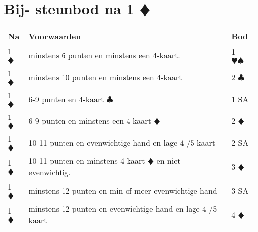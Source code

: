\documentclass[12pt,a4paper]{report}
\begin{document}
\section{Bij- steunbod na 1 $\vardiamondsuit$}
\begin{tabular}{|l|p{5cm}|l|}
	\hline 
	\textbf{Na} &\textbf{Voorwaarden}  &\textbf{Bod}  \\ 
	\hline
	
	1 $\vardiamondsuit$
	& minstens 6 punten\newline
	  en minstens een 4-kaart.
	& 1 $\varheartsuit \spadesuit$ \\ 
	\hline 
	
	1 $\vardiamondsuit$
	& minstens 10 punten\newline 
	  en minstens  een 4-kaart
	& 2 $\clubsuit$ \\ 
	\hline 
	
	1 $\vardiamondsuit$
	& 6-9 punten\newline 
	  en 4-kaart $\clubsuit$
	& 1 SA \\ 
	\hline 
	
	1 $\vardiamondsuit$
	& 6-9 punten\newline
	  en minstens een 4-kaart $\vardiamondsuit$
	& 2 $\vardiamondsuit$ \\ 
	\hline 
	
	1 $\vardiamondsuit$
	& 10-11 punten\newline
	  en evenwichtige hand\newline
	  en lage 4-/5-kaart
	& 2 SA \\ 
	\hline 
	
	1 $\vardiamondsuit$
	& 10-11 punten\newline
	  en minstens 4-kaart $\vardiamondsuit$\newline
	  en niet evenwichtig.
	& 3 $\vardiamondsuit$ \\ 
	\hline 
	
	1 $\vardiamondsuit$
	& minstens 12 punten\newline
	  en min of meer evenwichtige hand
	& 3 SA \\ 
	\hline 
	
	1 $\vardiamondsuit$
	& minstens 12 punten\newline
	  en  evenwichtige hand\newline
	  en lage 4-/5-kaart
	& 4 $\vardiamondsuit$ \\ 
	\hline 
\end{tabular}

\newpage
\end{document}
